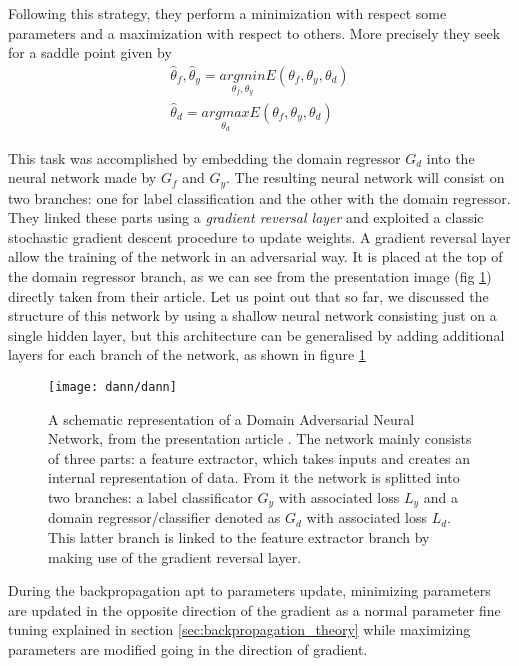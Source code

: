 \documentclass[11pt]{report}
\begin{document}
Following this strategy, they perform a minimization with respect some parameters and a maximization with respect to others. More precisely they seek for a saddle point given by
\begin{equation}
\begin{split}
\hat \theta_f, \hat \theta_y = \underset{\theta_f, \theta_y}{argmin} E(\theta_f, \theta_y, \theta_d) \\
\hat \theta_d = \underset{\theta_d}{argmax} E(\theta_f, \theta_y, \theta_d)
\end{split}
\end{equation}

This task was accomplished by embedding the domain regressor $G_d$ into the neural network made by $G_f$ and $G_y$. The resulting neural network will consist on two branches: one for label classification and the other with the domain regressor.
They linked these parts using a \emph{gradient reversal layer} and exploited a classic stochastic gradient descent procedure to update weights.
A gradient reversal layer allow the training of the network in an adversarial way. It is placed at the top of the domain regressor branch, as we can see from the presentation image (fig \ref{fig:dann_original}) directly taken from their article.
Let us point out that so far, we discussed the structure of this network by using a shallow neural network consisting just on a single hidden layer, but this architecture can be generalised by adding additional layers for each branch of the network, as shown in figure \ref{fig:dann_original}


\begin{figure}[h]
\centering
\texttt{[image: dann/dann]}
\caption{A schematic representation of a Domain Adversarial Neural Network, from the presentation article \cite{ganin2016}. The network mainly consists of three parts: a feature extractor, which takes inputs and creates an internal representation of data. From it the network is splitted into two branches: a label classificator $G_y$ with associated loss $L_y$ and a domain regressor/classifier denoted as $G_d$ with associated loss $L_d$. This latter branch is linked to the feature extractor branch by making use of the gradient reversal layer.
}\label{fig:dann_original}
\end{figure}




During the backpropagation apt to parameters update, minimizing parameters are updated in the opposite direction of the gradient as a normal parameter fine tuning explained in section \ref{sec:backpropagation_theory} while maximizing parameters are modified going in the direction of gradient.
\end{document}
